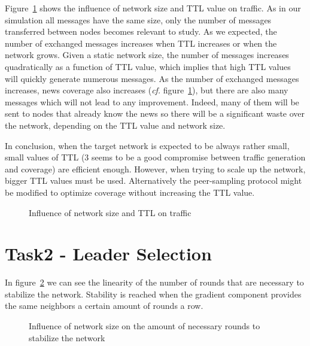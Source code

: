 \documentclass[conference]{IEEEtran}
\begin{document}
Figure~\ref{fig:T1_traffic} shows the influence of network size and TTL value on traffic. As in our simulation all messages have the same size, only the number of messages transferred between nodes becomes relevant to study.
As we expected, the number of exchanged messages increases when TTL increases or when the network grows.
Given a static network size, the number of messages increases quadratically as a function of TTL value, which implies that high TTL values will quickly generate numerous messages. As the number of exchanged messages increases, news coverage also increases (\textit{cf.} figure~\ref{fig:T1_traffic}), but there are also many messages which will not lead to any improvement. Indeed, many of them will be sent to nodes that already know the news so there will be a significant waste over the network, depending on the TTL value and network size.

In conclusion, when the target network is expected to be always rather small, small values of TTL (3 seems to be a good compromise between traffic generation and coverage) are efficient enough. However, when trying to scale up the network, bigger TTL values must be used. Alternatively the peer-sampling protocol might be modified to optimize coverage without increasing the TTL value.

\begin{figure}
\caption{Influence of network size and TTL on traffic}
\label{fig:T1_traffic}
\end{figure}

\section{Task2 - Leader Selection}

In figure~\ref{fig:T2_Stability} we can see the linearity of the number of rounds that are necessary to stabilize the network. Stability is reached when the gradient component provides the same neighbors a certain amount of rounds a row.
\begin{figure}
\caption{Influence of network size on the amount of necessary rounds to stabilize the network}
\label{fig:T2_Stability}
\end{figure}
\end{document}

